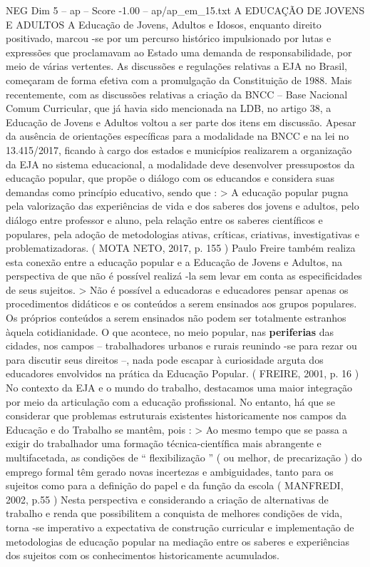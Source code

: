 \begin{textsample}{NEG Dim 5 – ap – Score -1.00 – ap/ap\_em\_15.txt}  \label{ex:f5_neg_127}
A EDUCAÇÃO DE JOVENS E ADULTOS A Educação de Jovens, Adultos e Idosos, enquanto direito positivado, marcou -se por um percurso histórico impulsionado por lutas e expressões que proclamavam ao Estado uma demanda de responsabilidade, por meio de várias vertentes.
As discussões e regulações relativas a EJA no Brasil, começaram de forma efetiva com a promulgação da Constituição de 1988.
Mais recentemente, com as discussões relativas a criação da BNCC – Base Nacional Comum Curricular, que já havia sido mencionada na LDB, no artigo 38, a Educação de Jovens e Adultos voltou a ser parte dos itens em discussão.
Apesar da ausência de orientações específicas para a modalidade na BNCC e na lei no 13.415/2017, ficando à cargo dos estados e municípios realizarem a organização da EJA no sistema educacional, a modalidade deve desenvolver pressupostos da educação popular, que propõe o diálogo com os educandos e considera suas demandas como princípio educativo, sendo que : > A educação popular pugna pela valorização das experiências de vida e dos saberes dos jovens e adultos, pelo diálogo entre professor e aluno, pela relação entre os saberes científicos e populares, pela adoção de metodologias ativas, críticas, criativas, investigativas e problematizadoras. ( MOTA NETO, 2017, p. 155 ) Paulo Freire também realiza esta conexão entre a educação popular e a Educação de Jovens e Adultos, na perspectiva de que não é possível realizá -la sem levar em conta as especificidades de seus sujeitos. > Não é possível a educadoras e educadores pensar apenas os procedimentos didáticos e os conteúdos a serem ensinados aos grupos populares.
Os próprios conteúdos a serem ensinados não podem ser totalmente estranhos àquela cotidianidade.
O que acontece, no meio popular, nas \textbf{periferias} das cidades, nos campos – trabalhadores urbanos e rurais reunindo -se para rezar ou para discutir seus direitos –, nada pode escapar à curiosidade arguta dos educadores envolvidos na prática da Educação Popular. ( FREIRE, 2001, p. 16 ) No contexto da EJA e o mundo do trabalho, destacamos uma maior integração por meio da articulação com a educação profissional.
No entanto, há que se considerar que problemas estruturais existentes historicamente nos campos da Educação e do Trabalho se mantêm, pois : > Ao mesmo tempo que se passa a exigir do trabalhador uma formação técnica-científica mais abrangente e multifacetada, as condições de “ flexibilização ” ( ou melhor, de precarização ) do emprego formal têm gerado novas incertezas e ambiguidades, tanto para os sujeitos como para a definição do papel e da função da escola ( MANFREDI, 2002, p.55 ) Nesta perspectiva e considerando a criação de alternativas de trabalho e renda que possibilitem a conquista de melhores condições de vida, torna -se imperativo a expectativa de construção curricular e implementação de metodologias de educação popular na mediação entre os saberes e experiências dos sujeitos com os conhecimentos historicamente acumulados.

\end{textsample}
